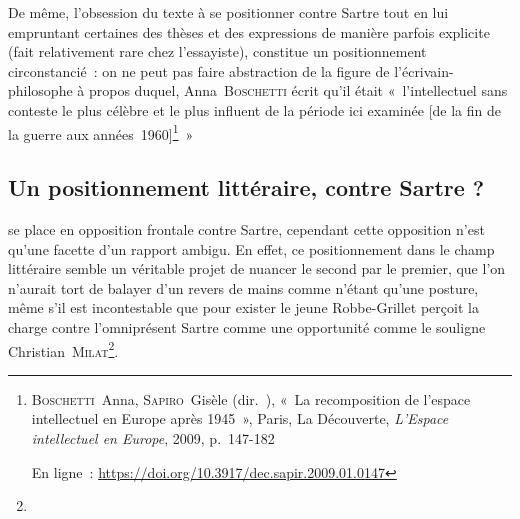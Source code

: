 \documentclass[12pt, a4paper]{article}
\begin{document}

De même, l'obsession du texte à se positionner contre Sartre tout en lui empruntant certaines des thèses et des expressions de manière parfois explicite (fait relativement rare chez l'essayiste), constitue un positionnement circonstancié~: on ne peut pas faire abstraction de la figure de l'écrivain-philosophe à propos duquel, Anna~\textsc{Boschetti} écrit qu'il était «~l’intellectuel sans conteste le plus célèbre et le plus influent de la période ici examinée [de la fin de la guerre aux années~1960]\footnote{\textsc{Boschetti}~Anna, \textsc{Sapiro}~Gisèle (dir.~), «~La recomposition de l'espace intellectuel en Europe après 1945~», Paris, La Découverte, \textit{L'Espace intellectuel en Europe}, 2009, p.~147-182

En ligne~: \href{https://doi.org/10.3917/dec.sapir.2009.01.0147}{https://doi.org/10.3917/dec.sapir.2009.01.0147}}~»

\subsection{Un positionnement littéraire, contre Sartre ?}
\label{vsSartre}

\robbe{} se place en opposition frontale contre Sartre, cependant cette opposition n'est qu'une facette d'un rapport ambigu. En effet, ce positionnement dans le champ littéraire semble un véritable projet de nuancer le second par le premier, que l'on n'aurait tort de balayer d'un revers de mains comme n'étant qu'une posture, même s'il est incontestable que pour exister le jeune Robbe-Grillet perçoit la charge contre l'omniprésent Sartre comme une opportunité comme le souligne Christian~\textsc{Milat}\footnote{}.
\end{document}
